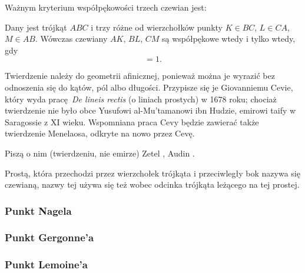 %

Ważnym kryterium współpękowości trzech czewian jest:

\begin{theorem}[Cevy]
	Dany jest trójkąt $ABC$ i trzy różne od wierzchołków punkty $K \in BC$, $L \in CA$, $M \in AB$.
	Wówczas czewiany $AK$, $BL$, $CM$ są współpękowe wtedy i tylko wtedy, gdy
	\begin{equation}
		[AMB] [BKC] [CLA] = 1.
	\end{equation}
\end{theorem}

Twierdzenie należy do geometrii afinicznej, ponieważ można je wyrazić bez odnoszenia się do kątów, pól albo długości.
Przypisze się je Giovanniemu Cevie, który wyda pracę \emph{De lineis rectis} (o liniach prostych) w 1678 roku; chociaż twierdzenie nie było obce Yusufowi al-Mu'tamanowi ibn Hudzie, emirowi taify w Saragossie z XI wieku.
%
%
Wspomniana praca Cevy będzie zawierać także twierdzenie Menelaosa, odkryte na nowo przez Cevę.

Piszą o nim (twierdzeniu, nie emirze) Zetel \cite[s. 11-14]{zetel_2020}, Audin \cite[s. 38]{audin_2003}.

Prostą, która przechodzi przez wierzchołek trójkąta i przeciwległy bok nazywa się czewianą, nazwy tej używa się też wobec odcinka trójkąta leżącego na tej prostej.

\begin{proposition}
\end{proposition}

\subsubsection{Punkt Nagela}

\subsubsection{Punkt Gergonne'a}


\subsubsection{Punkt Lemoine'a}




%